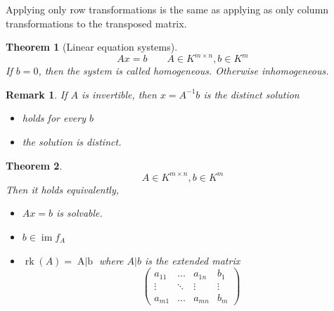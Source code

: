 \documentclass[a4paper,landscape,twocolumn]{article}
\newtheorem{theorem}{Theorem}
\newtheorem{rem}{Remark}
\DeclareMathOperator\image{im} %
\begin{document}
Applying only row transformations is the same as applying as only column transformations to the transposed matrix.

\begin{theorem}[Linear equation systems]
  \[ Ax = b \qquad A \in K^{m\times n}, b \in K^m \]
  If $b=0$, then the system is called \emph{homogeneous}. Otherwise \emph{inhomogeneous}.
\end{theorem}
\begin{rem}
  If $A$ is invertible, then $x = A^{-1} b$ is the distinct solution
  \begin{itemize}
    \item holds for every $b$
    \item the solution is distinct.
  \end{itemize}
\end{rem}
\begin{theorem}
  \label{satz-6.43}
  \[ A \in K^{m\times n}, b \in K^m \]
  Then it holds equivalently,
  \begin{itemize}
    \item $Ax = b$ is solvable.
    \item $b \in \image{f_A}$
    \item $\operatorname{rk}(A) = \operatorname{A | b}$
      where $A | b$ is the extended matrix
      \[
        \begin{pmatrix}
          a_{11} & \ldots & a_{1n} & b_1 \\
          \vdots & \ddots & \vdots & \vdots \\
          a_{m1} & \ldots & a_{mn} & b_m
        \end{pmatrix}
      \]
  \end{itemize}
\end{theorem}
\end{document}
